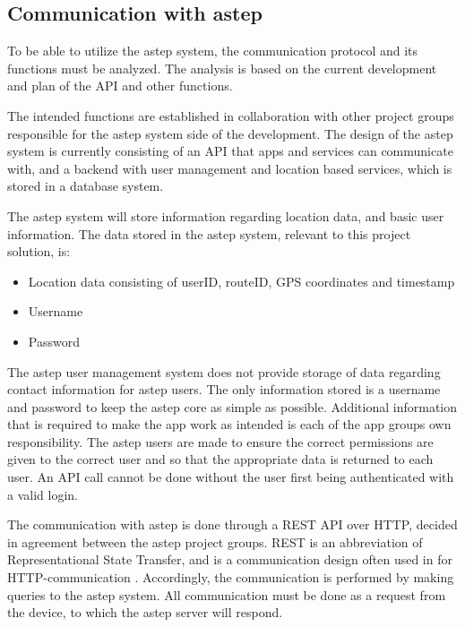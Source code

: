 \subsection{Communication with \gls{astep}}\label{ssec:communicationwithastep}
To be able to utilize the \gls{astep} system, the communication protocol and its functions must be analyzed. 
The analysis is based on the current development and plan of the API and other functions.

The intended functions are established in collaboration with other project groups responsible for the \gls{astep} system side of the development. 
The design of the \gls{astep} system is currently consisting of an API that apps and services can communicate with, and a backend with user management and location based services, which is stored in a database system.

The \gls{astep} system will store information regarding location data, and basic user information. 
The data stored in the \gls{astep} system, relevant to this project solution, is:
\begin{itemize}
	\item Location data consisting of userID, routeID, GPS coordinates and timestamp
	\item Username
	\item Password
\end{itemize}

The \gls{astep} user management system does not provide storage of data regarding contact information for \gls{astep} users.
The only information stored is a username and password to keep the \gls{astep} core as simple as possible.
Additional information that is required to make the app work as intended is each of the app groups own responsibility.
The \gls{astep} users are made to ensure the correct permissions are given to the correct user and so that the appropriate data is returned to each user.
An API call cannot be done without the user first being authenticated with a valid login.

The communication with \gls{astep} is done through a REST API over HTTP, decided in agreement between the \gls{astep} project groups.
REST is an abbreviation of Representational State Transfer, and is a communication design often used in for HTTP-communication \cite{REST}.
Accordingly, the communication is performed by making queries to the \gls{astep} system. 
All communication must be done as a request from the device, to which the \gls{astep} server will respond.

